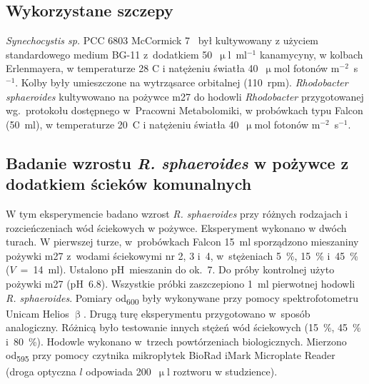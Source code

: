 \subsection{Wykorzystane szczepy}\label{subsec:szczepy}
\textit{Synechocystis sp.} PCC 6803 McCormick 7~\cite{Puchalski2021}
był kultywowany z użyciem standardowego medium BG-11 z~dodatkiem 
50~$\upmu$l~ml$^{-1}$ kanamycyny, w kolbach Erlenmayera,
w temperaturze 28 \degree C i natężeniu światła
40~$\upmu$mol fotonów m$^{-2}$~s$^{-1}$.
Kolby były umieszczone na wytrząsarce orbitalnej (110~rpm).
\textit{Rhodobacter sphaeroides} kultywowano na pożywce \acrshort{m27}
do hodowli \textit{Rhodobacter} przygotowanej wg.\ protokołu
dostępnego w~Pracowni Metabolomiki, w probówkach typu
Falcon (50~ml), w temperaturze 20~\degree C i natężeniu światła
40~$\upmu$mol fotonów m$^{-2}$~s$^{-1}$.

\subsection{Badanie wzrostu \textit{R. sphaeroides} w pożywce z dodatkiem ścieków komunalnych}\label{subsec:rhodobacter}
W tym eksperymencie badano wzrost \textit{R. sphaeroides} przy
różnych rodzajach i rozcieńczeniach wód ściekowych w pożywce.
Eksperyment wykonano w dwóch turach.
W pierwszej turze, w~probówkach Falcon 15~ml sporządzono
mieszaniny pożywki \acrshort{m27} z~wodami ściekowymi nr 2, 3 i~4,
w~stężeniach 5~\%, 15~\% i~45~\% ($V$~=~14~ml).
Ustalono pH~mieszanin do ok.\ 7.
Do próby kontrolnej użyto pożywki \acrshort{m27} (pH~6.8).
Wszystkie próbki zaszczepiono 1~ml pierwotnej hodowli
\textit{R. sphaeroides}.
Pomiary \acrshort{od}\textsubscript{600} były wykonywane przy pomocy
spektrofotometru Unicam Helios $\upbeta$.
Drugą turę eksperymentu przygotowano w~sposób analogiczny.
Różnicą było testowanie innych stężeń wód ściekowych
(15~\%, 45~\% i~80~\%).
Hodowle wykonano w~trzech powtórzeniach biologicznych.
Mierzono \acrshort{od}\textsubscript{595} przy pomocy czytnika
mikropłytek BioRad iMark Microplate Reader
(droga optyczna $l$ odpowiada 200~$\upmu$l roztworu w studzience).

